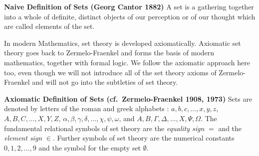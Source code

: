 

\para \textbf{Naive Definition of Sets (Georg Cantor 1882)} 
 A set is a gathering together into a whole of definite, distinct objects of our perception 
 or of our thought  which are called elements of the set. 

\para In modern Mathematics, set theory is developed axiomatically. Axiomatic set theory goes back to Zermelo-Fraenkel and forms the basis of modern mathematics, together with formal logic. We follow the
axiomatic approach here too, even though we will not introduce all of the set theory axioms 
of Zermelo-Fraenkel and will not go into the subtleties of set theory. 

\para \textbf{Axiomatic Definition of Sets (cf.~Zermelo-Fraenkel 1908, 1973)} 
Sets are denoted by letters of the roman and greek alphabets :
$a,b,c,\ldots,x,y,z$, $A,B,C,\ldots,X,Y,Z$, $\alpha,\beta,\gamma,\delta,\ldots, \chi,\psi, \omega$, and 
$A,B,\Gamma, \Delta, \ldots,X,\Psi,\Omega$.
The fundamental relational symbols of set theory are the \emph{equality sign} $=$ and the \emph{element sign}
$\in$. Further symbols of set theory are the numerical constants $0,1,2,\ldots , 9$ and the 
symbol for the empty set $\emptyset$. 



